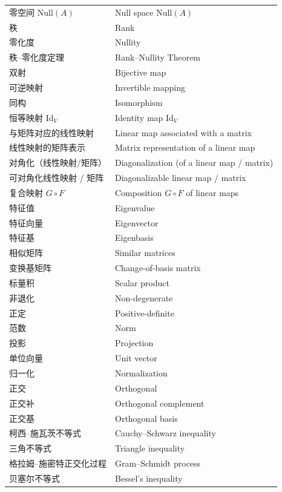 \begin{center}
\begin{longtable}{|>{\raggedright\arraybackslash}p{5cm}|>{\raggedright\arraybackslash}p{8cm}|}
			零空间 $\mathrm{Null}(A)$ & Null space $\mathrm{Null}(A)$ \\
			秩 & Rank \\
			零化度 & Nullity \\
			秩–零化度定理 & Rank–Nullity Theorem \\
			双射 & Bijective map \\
			可逆映射 & Invertible mapping \\
			同构 & Isomorphism \\
			恒等映射 $\mathrm{Id}_V$ & Identity map $\mathrm{Id}_V$ \\
			与矩阵对应的线性映射 & Linear map associated with a matrix \\
			线性映射的矩阵表示 & Matrix representation of a linear map \\
			对角化（线性映射/矩阵） & Diagonalization (of a linear map / matrix) \\
			可对角化线性映射 / 矩阵 & Diagonalizable linear map / matrix \\
			复合映射 $G\circ F$ & Composition $G\circ F$ of linear maps \\
			特征值 & Eigenvalue \\
			特征向量 & Eigenvector \\
			特征基 & Eigenbasis \\
			相似矩阵 & Similar matrices \\
			变换基矩阵 & Change-of-basis matrix \\
			标量积 & Scalar product \\
			非退化 & Non-degenerate \\
			正定 & Positive-definite \\
			范数 & Norm \\
			投影 & Projection \\
			单位向量 & Unit vector \\
			归一化 & Normalization \\
			正交 & Orthogonal \\
			正交补 & Orthogonal complement \\
			正交基 & Orthogonal basis \\
			柯西–施瓦茨不等式 & Cauchy–Schwarz inequality \\
			三角不等式 & Triangle inequality \\
			格拉姆–施密特正交化过程 & Gram–Schmidt process \\
			贝塞尔不等式 & Bessel's inequality \\
		\end{longtable}
	\end{center}
